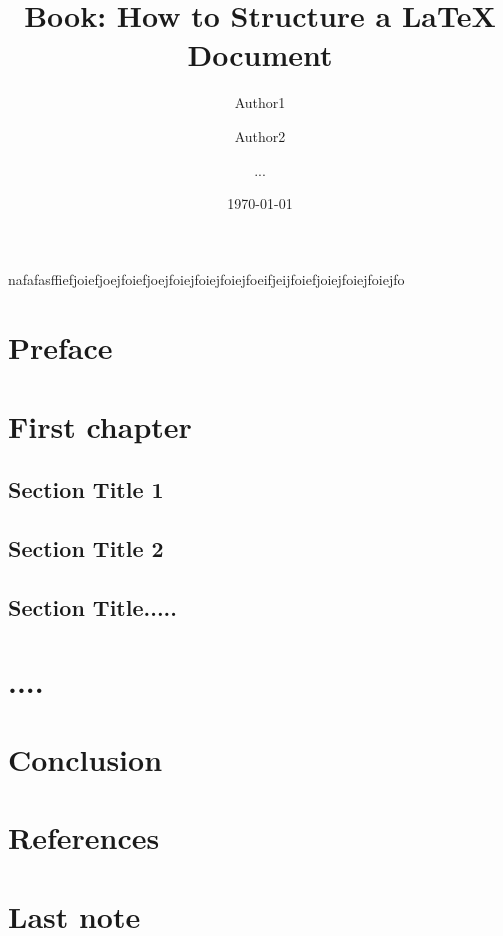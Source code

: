 \documentclass[11pt,a4paper]{book}
\begin{document}
\title{Book: How to Structure a LaTeX Document}
\author{Author1 \and Author2 \and ...}
\date{\today}

\maketitle
nafafasffiefjoiefjoejfoiefjoejfoiejfoiejfoiejfoeifjeijfoiefjoiejfoiejfoiejfo

\frontmatter

\chapter{Preface}

\mainmatter
\chapter{First chapter}
\section{Section Title 1}
\section{Section Title 2}
\section{Section Title.....}

\chapter{....}

\chapter{Conclusion}

\chapter*{References}


\backmatter
\chapter{Last note}
\end{document}
